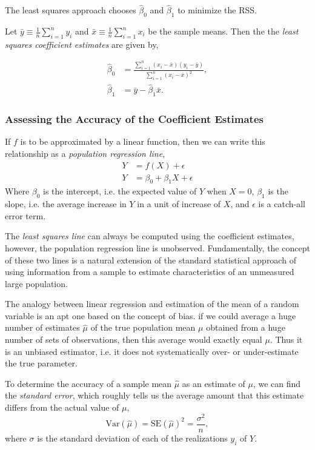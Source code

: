 \documentclass{article}
\numberwithin{equation}{section}
\begin{document}
The least squares approach chooses $\hat \beta_0 $ and $\hat \beta_1$ to minimize the RSS.

Let $ \bar y \equiv \frac{1}{n} \sum^n_{i=1} y_i$ and $\bar x \equiv \frac{1}{n} \sum_{i=1}^n x_i$ be the sample means. Then the the \textit{least squares coefficient estimates} are given by,

\begin{align*}
    \hat \beta_0 &= \frac{\sum_{i=1}^n (x_i - \bar x) (y_i - \bar y)}{\sum_{i=1}^n (x_i - \bar x)^2}, \\ 
    \hat \beta_1 &= \bar y - \hat \beta_1 \bar x.
\end{align*}

 
\subsubsection{Assessing the Accuracy of the Coefficient Estimates}

If $f$ is to be approximated by a linear function, then we can write this relationship as a \textit{population regression line},
\begin{align*}
 Y &= f(X) +  \epsilon \\
 Y  &= \beta_0 +  \beta_1 X + \epsilon
\end{align*}
Where $\beta_0$ is the intercept, i.e. the expected value of $Y$ when $X = 0$, $\beta_1$ is the slope, i.e.  the average increase in $Y$ in a unit of increase of $X$, and $\epsilon$ is a catch-all error term.
 
The \textit{least squares line} can always be computed using the coefficient estimates, however, the population regression line is unobserved. Fundamentally, the concept of these two lines is a natural extension of the standard statistical approach of using information from a sample to estimate characteristics of an unmeasured large population.
 
The analogy between linear regression and estimation of the mean of a
random variable is an apt one based on the concept of bias. if we could average a huge number of estimates $\hat \mu$ of the true population mean $\mu$ obtained from a huge number of sets of observations, then this average would exactly equal $\mu$. Thus it is an unbiased estimator, i.e. it does not systematically over- or under-estimate the true parameter. 

To determine the accuracy of a sample mean $\hat \mu$ as an estimate of $\mu$, we can find the \textit{standard error}, which roughly tells us the average amount that this estimate differs from the actual value of $\mu$,
\begin{equation}
    \text{Var} (\hat \mu) = \text{SE} (\hat \mu ) ^2 = \frac{\sigma^2}{n},
\end{equation}
where $\sigma$ is the standard deviation of each of the realizations $y_i$ of $Y$.
\end{document}
